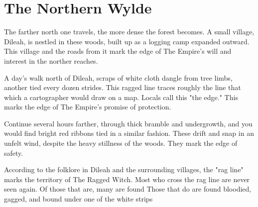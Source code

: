 \section{The Northern Wylde}

The farther north one travels, the more dense the forest becomes.
A small village, Dileah, is nestled in these woods, built up as a logging camp expanded outward.
This village and the roads from it mark the edge of The Empire's will and interest in the norther
 reaches.

A day's walk north of Dileah, scraps of white cloth dangle from tree limbs, another tied every
 dozen strides.
This ragged line traces roughly the line that which a cartographer would draw on a map.
Locals call this "the edge."
This marks the edge of The Empire's promise of protection.

Continue several hours farther, through thick bramble and undergrowth, and you would find
 bright red ribbons tied in a similar fashion.
These drift and snap in an unfelt wind, despite the heavy stillness of the woods.
They mark the edge of safety.

According to the folklore in Dileah and the surrounding villages, the "rag line" marks the territory
 of The Ragged Witch.
Most who cross the rag line are never seen again.
Of those that are, many are found
Those that do are found bloodied, gagged, and bound under one of the white strips
